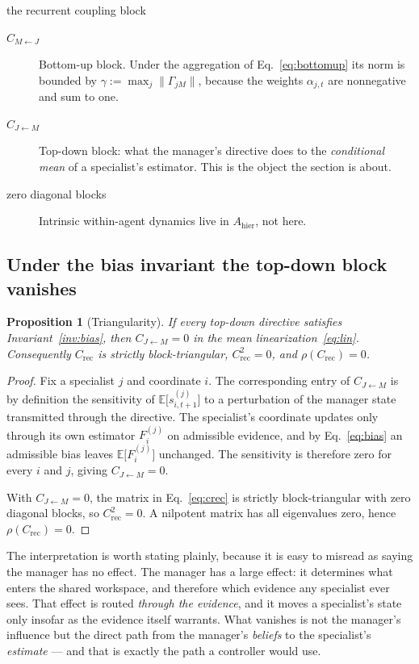 \documentclass[11pt]{article}
\newtheorem{proposition}{Proposition}
\begin{document}
\begin{equationguide}{the recurrent coupling block}
\begin{description}
\item[{$C_{M\leftarrow J}$}] Bottom-up block. Under the aggregation of Eq.~\eqref{eq:bottomup} its norm is bounded by $\gamma:=\max_j\|\Gamma_{jM}\|$, because the weights $\alpha_{j,t}$ are nonnegative and sum to one.
\item[{$C_{J\leftarrow M}$}] Top-down block: what the manager's directive does to the \emph{conditional mean} of a specialist's estimator. This is the object the section is about.
\item[{zero diagonal blocks}] Intrinsic within-agent dynamics live in $A_{\mathrm{hier}}$, not here.
\end{description}
\end{equationguide}

\subsection{Under the bias invariant the top-down block vanishes}

\begin{proposition}[Triangularity]
\label{prop:triangular}
If every top-down directive satisfies Invariant~\ref{inv:bias}, then $C_{J\leftarrow M}=0$ in the mean linearization~\eqref{eq:lin}. Consequently $C_{\mathrm{rec}}$ is strictly block-triangular, $C_{\mathrm{rec}}^{2}=0$, and $\rho(C_{\mathrm{rec}})=0$.
\end{proposition}

\begin{proof}
Fix a specialist $j$ and coordinate $i$. The corresponding entry of $C_{J\leftarrow M}$ is by definition the sensitivity of $\mathbb{E}\big[s^{(j)}_{i,t+1}\big]$ to a perturbation of the manager state transmitted through the directive. The specialist's coordinate updates only through its own estimator $F^{(j)}_i$ on admissible evidence, and by Eq.~\eqref{eq:bias} an admissible bias leaves $\mathbb{E}\big[F^{(j)}_i\big]$ unchanged. The sensitivity is therefore zero for every $i$ and $j$, giving $C_{J\leftarrow M}=0$.

With $C_{J\leftarrow M}=0$, the matrix in Eq.~\eqref{eq:crec} is strictly block-triangular with zero diagonal blocks, so $C_{\mathrm{rec}}^{2}=0$. A nilpotent matrix has all eigenvalues zero, hence $\rho(C_{\mathrm{rec}})=0$.
\end{proof}

The interpretation is worth stating plainly, because it is easy to misread as saying the manager has no effect. The manager has a large effect: it determines what enters the shared workspace, and therefore which evidence any specialist ever sees. That effect is routed \emph{through the evidence}, and it moves a specialist's state only insofar as the evidence itself warrants. What vanishes is not the manager's influence but the direct path from the manager's \emph{beliefs} to the specialist's \emph{estimate} --- and that is exactly the path a controller would use.
\end{document}
